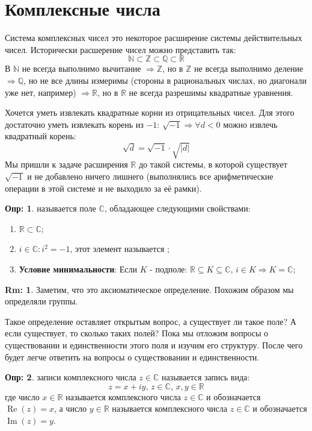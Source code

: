 \documentclass[12pt]{article}
\newcommand{\MR}{\mathbb{R}}
\newcommand{\MC}{\mathbb{C}}
\newcommand{\MQ}{\mathbb{Q}}
\newcommand{\MN}{\mathbb{N}}
\newcommand{\MZ}{\mathbb{Z}}
\theoremstyle{definition}
\newtheorem{defn}{Опр:}
\newtheorem{rem}{Rm:}
\DeclareMathOperator{\IM}{\operatorname{Im}}
\DeclareMathOperator{\RE}{\operatorname{Re}}
\begin{document}
\newpage
\section*{Комплексные числа}
Система комплексных чисел это некоторое расширение системы действительных чисел. Исторически расшерение чисел можно представить так:
$$
	\MN \subset \MZ \subset \MQ \subset \MR 
$$
В $\MN$ не всегда выполнимо вычитание $\Rightarrow \MZ$, но в $\MZ$ не всегда выполнимо деление $\Rightarrow \MQ$, но не все длины измеримы (стороны в рациональных числах, но диагонали уже нет, например) $\Rightarrow \MR$, но в $\MR$ не всегда разрешимы квадратные уравнения.

Хочется уметь извлекать квадратные корни из отрицательных чисел. Для этого достаточно уметь извлекать корень из $-1$: $\sqrt{-1} \Rightarrow \forall d < 0$ можно извлечь квадратный корень:
$$
	\sqrt{d} = \sqrt{-1}{\cdot}\sqrt{|d|}
$$
Мы пришли к задаче расширения $\MR$ до такой системы, в которой существует $\sqrt{-1}$ и не добавлено ничего лишнего (выполнялись все арифметические операции в этой системе и не выходило за её рамки).
\begin{defn}
	 называется поле $\MC$, обладающее следующими свойствами:
	\begin{enumerate}[label=\arabic*)]
		\item $\MR \subset \MC$;
		\item $i \in \MC \colon i^2 = -1$, этот элемент называется ;
		\item \textbf{Условие минимальности}: Если $K$ - подполе: $\MR \subseteq K \subseteq \MC, \, i \in K \Rightarrow K = \MC$;
	\end{enumerate}
\end{defn}
\begin{rem}
	Заметим, что это аксиоматическое определение. Похожим образом мы определяли группы.
\end{rem}
Такое определение оставляет открытым вопрос, а существует ли такое поле? А если существует, то сколько таких полей? Пока мы отложим вопросы о существовании и единственности этого поля и изучим его структуру. После чего будет легче ответить на вопросы о существовании и единственности.

\begin{defn}
	 записи комплексного числа $z \in \MC$ называется запись вида: 
	$$
		z = x + iy, \, z \in \MC, \, x,y \in \MR
	$$
	где число $x \in \MR$ называется  комплексного числа $z \in \MC$ и обозначается $\RE{(z)} = x$, а число $y \in \MR$ называется  комплексного числа $z \in \MC$ и обозначается $\IM{(z)} = y$. 
\end{defn}
\end{document}
